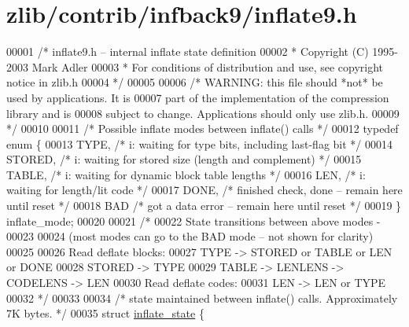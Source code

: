 \hypertarget{zlib_2contrib_2infback9_2inflate9_8h_source}{}\section{zlib/contrib/infback9/inflate9.h}
\label{zlib_2contrib_2infback9_2inflate9_8h_source}

\begin{DoxyCode}
00001 \textcolor{comment}{/* inflate9.h -- internal inflate state definition}
00002 \textcolor{comment}{ * Copyright (C) 1995-2003 Mark Adler}
00003 \textcolor{comment}{ * For conditions of distribution and use, see copyright notice in zlib.h}
00004 \textcolor{comment}{ */}
00005 
00006 \textcolor{comment}{/* WARNING: this file should *not* be used by applications. It is}
00007 \textcolor{comment}{   part of the implementation of the compression library and is}
00008 \textcolor{comment}{   subject to change. Applications should only use zlib.h.}
00009 \textcolor{comment}{ */}
00010 
00011 \textcolor{comment}{/* Possible inflate modes between inflate() calls */}
00012 \textcolor{keyword}{typedef} \textcolor{keyword}{enum} \{
00013         TYPE,       \textcolor{comment}{/* i: waiting for type bits, including last-flag bit */}
00014         STORED,     \textcolor{comment}{/* i: waiting for stored size (length and complement) */}
00015         TABLE,      \textcolor{comment}{/* i: waiting for dynamic block table lengths */}
00016             LEN,        \textcolor{comment}{/* i: waiting for length/lit code */}
00017     DONE,       \textcolor{comment}{/* finished check, done -- remain here until reset */}
00018     BAD         \textcolor{comment}{/* got a data error -- remain here until reset */}
00019 \} inflate\_mode;
00020 
00021 \textcolor{comment}{/*}
00022 \textcolor{comment}{    State transitions between above modes -}
00023 \textcolor{comment}{}
00024 \textcolor{comment}{    (most modes can go to the BAD mode -- not shown for clarity)}
00025 \textcolor{comment}{}
00026 \textcolor{comment}{    Read deflate blocks:}
00027 \textcolor{comment}{            TYPE -> STORED or TABLE or LEN or DONE}
00028 \textcolor{comment}{            STORED -> TYPE}
00029 \textcolor{comment}{            TABLE -> LENLENS -> CODELENS -> LEN}
00030 \textcolor{comment}{    Read deflate codes:}
00031 \textcolor{comment}{                LEN -> LEN or TYPE}
00032 \textcolor{comment}{ */}
00033 
00034 \textcolor{comment}{/* state maintained between inflate() calls.  Approximately 7K bytes. */}
00035 \textcolor{keyword}{struct }\hyperlink{structinflate__state}{inflate\_state} \{

\end{DoxyCode}
